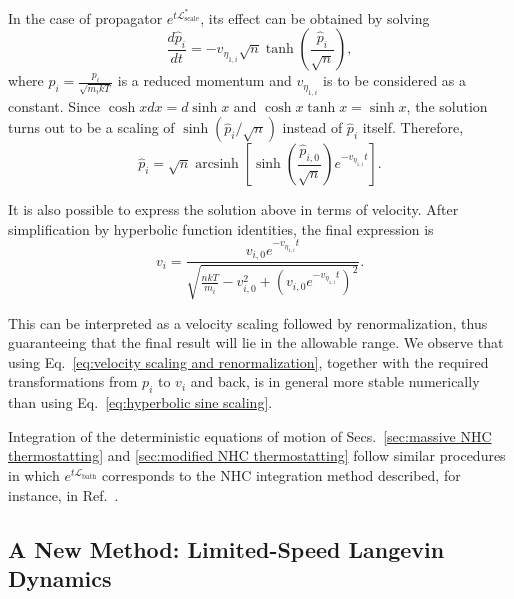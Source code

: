 \documentclass[
aip,
jcp,
reprint,
]{revtex4-1}
\DeclareMathOperator\arcsinh{arcsinh}
\newcommand{\vt}[1]{\boldsymbol{\mathbf{#1}}}          %
\newcommand{\Liu}{\mathcal{L}}
\newcommand{\nn}{n}
\begin{document}
In the case of propagator $e^{t \mathcal{L}_\mathrm{scale}^\ast}$, its effect can be obtained by solving
\begin{equation*}
\frac{d \hat{p}_i}{d t} = - v_{\eta_{1,i}} \sqrt{\nn} \tanh\left(\frac{\hat{p}_i}{\sqrt{\nn}}\right),
\end{equation*}
where $\hat{p}_i = \frac{p_i}{\sqrt{m_i kT}}$ is a reduced momentum and $v_{\eta_{1,i}}$ is to be considered as a constant.
Since $\cosh x dx = d \sinh x$ and $\cosh x \tanh x = \sinh x$, the solution turns out to be a scaling of $\sinh\left({\hat{p}_i}/{\sqrt{\nn}}\right)$ instead of $\hat{p}_i$ itself.
Therefore,
\begin{equation}
\label{eq:hyperbolic sine scaling}
\hat{p}_i = \sqrt{\nn} \arcsinh\left[\sinh \left(\frac{\hat{p}_{i,0}}{\sqrt{\nn}}\right) e^{-v_{\eta_{1,i}} t}\right].
\end{equation}

It is also possible to express the solution above in terms of velocity.
After simplification by hyperbolic function identities, the final expression is
\begin{equation}
\label{eq:velocity scaling and renormalization}
v_i = \frac{v_{i,0} e^{-v_{\eta_{1,i}} t}}{\sqrt{\frac{\nn kT}{m_i} - v_{i,0}^2 + \left(v_{i,0} e^{- v_{\eta_{1,i}} t}\right)^2}}.
\end{equation}

This can be interpreted as a velocity scaling followed by renormalization, thus guaranteeing that the final result will lie in the allowable range.
We observe that using Eq.~\eqref{eq:velocity scaling and renormalization}, together with the required transformations from $p_i$ to $v_i$ and back, is in general more stable numerically than using Eq.~\eqref{eq:hyperbolic sine scaling}.

Integration of the deterministic equations of motion of Secs.~\ref{sec:massive NHC thermostatting} and \ref{sec:modified NHC thermostatting} follow similar procedures in which $e^{t \Liu_\mathrm{bath}}$ corresponds to the NHC integration method described, for instance, in Ref.~.

\subsection{A New Method: Limited-Speed Langevin Dynamics}
\end{document}
